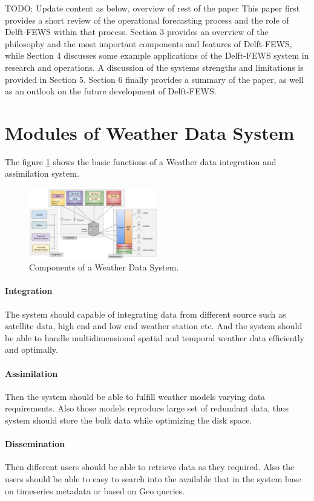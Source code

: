 \documentclass[conference]{IEEEtran}
\begin{document}
TODO: Update content as below, overview of rest of the paper
This paper first provides a short review of the operational forecasting process and the role of Delft-FEWS within that process. Section 3 provides an overview of the philosophy and the most important components and features of Delft-FEWS, while Section 4 discusses some example applications of the Delft-FEWS system in research and operations. A discussion of the systems strengths and limitations is provided in Section 5. Section 6 finally provides a summary of the paper, as well as an outlook on the future development of Delft-FEWS.
\section{Modules of Weather Data System}
The figure \ref{fi:wdia_components} shows the basic functions of a Weather data integration and assimilation system.
\begin{figure}[htbp]
\centerline{\includegraphics[width=0.5\textwidth]{method/misc/weather_data_system_components.jpg}}
\caption{Components of a Weather Data System.}
\label{fi:wdia_components}
\end{figure}
\paragraph{Integration} The system should capable of integrating data from different source such as satellite data, high end and low end weather station etc. And the system should be able to handle multidimensional spatial and temporal weather data efficiently and optimally. 
\paragraph{Assimilation} Then the system should be able to fulfill weather models varying data requirements. Also those models reproduce large set of redundant data, thus system should store the bulk data while optimizing the disk space.
\paragraph{Dissemination} Then different users should be able to retrieve data as they required. Also the users should be able to easy to search into the available that in the system base on timeseries metadata or based on Geo queries.
\end{document}
